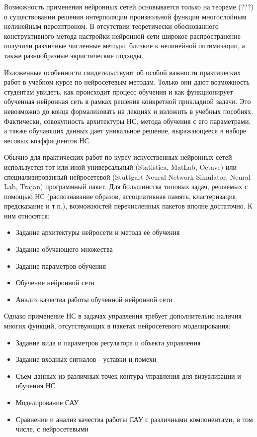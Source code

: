 Возможность применения нейронных сетей основывается только на теореме
(???) о существовании решения интерполяции произвольной функции
многослойным нелинейным персептроном.  В отсутствии теоретически
обоснованного конструктивного метода настройки нейронной сети широкое
распространение получили различные численные методы, близкие к
нелинейной оптимизации, а также разнообразные эвристические подходы.

Изложенные особенности свидетельствуют об особой важности практических
работ в учебном курсе по нейросетевым методам.  Только они дают
возможность студентам увидеть, как происходит процесс обучения и как
функционирует обученная нейронная сеть в рамках решения конкретной
прикладной задачи.  Это невозможно до конца формализовать на лекциях и
изложить в учебных пособиях.  Фактически, совокупность архитектуры НС,
метода обучения с его параметрами, а также обучающих данных дает
уникальное решение, выражающееся в наборе весовых коэффициентов НС.


Обычно для практических работ по курсу искусственных нейронных сетей
используется тот или иной универсальный (Statistica, MatLab, Octave)
или специализированный нейросетевой (Stuttgart Neural Network
Simulator, Neural Lab, Trajan) программный пакет.  Для большинства
типовых задач, решаемых с помощью НС (распознавание образов,
ассоциативная память, кластеризация, предсказание и т.п.),
возможностей перечисленных пакетов вполне достаточно.  К ним
относятся:

\begin{itemize}
\item Задание архитектуры нейросети и метода её обучения
\item Задание обучающего множества
\item Задание параметров обучения
\item Обучение нейронной сети
\item Анализ качества работы обученной нейронной сети
\end{itemize}

Однако применение НС в задачах управления требует дополнительно
наличия многих функций, отсутствующих в пакетах нейросетевого
моделирования:

\begin{itemize}
\item Задание вида и параметров регулятора и объекта управления
\item Задание входных сигналов - уставки и помехи
\item Съем данных из различных точек контура управления для
  визуализации и обучения НС
\item Моделирование САУ
\item Сравнение и анализ качества работы САУ с различными
  компонентами, в том числе, с нейросетевыми
\end{itemize}

